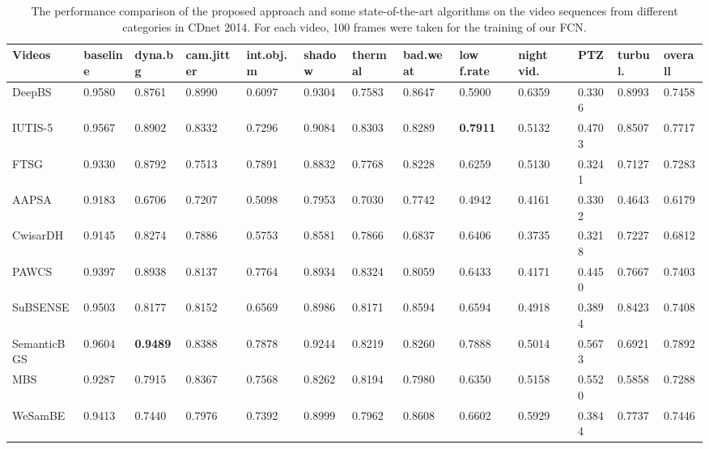 \documentclass[journal]{IEEEtran}
\begin{document}
\begin{table}[!t]				%
\centering
\caption{The performance comparison of the proposed approach and some state-of-the-art algorithms on the video sequences from different categories in CDnet 2014. For each video, 100 frames were taken for the training of our FCN.}
\label{tab1}
\begin{tabular}{lllllllllllll}
\hline
Videos      & baseline & dyna.bg & cam.jitter & int.obj.m & shadow & thermal & bad.weat & low f.rate & night vid. & PTZ    & turbul. & overall \\ \hline
DeepBS\cite{Babaee2017deep}      & 0.9580   & 0.8761  & 0.8990     & 0.6097    & 0.9304 & 0.7583  & 0.8647   & 0.5900     & 0.6359     & 0.3306 & 0.8993  & 0.7458  \\
IUTIS-5\cite{Bianco2017TEC}     & 0.9567   & 0.8902  & 0.8332     & 0.7296    & 0.9084 & 0.8303  & 0.8289   & \textbf{0.7911}     & 0.5132     & 0.4703 & 0.8507  & 0.7717  \\
FTSG\cite{Wang2014FTSG}        & 0.9330   & 0.8792  & 0.7513     & 0.7891    & 0.8832 & 0.7768  & 0.8228   & 0.6259     & 0.5130     & 0.3241 & 0.7127  & 0.7283  \\
AAPSA\cite{RAMIREZALONSO2016990}       & 0.9183   & 0.6706  & 0.7207     & 0.5098    & 0.7953 & 0.7030  & 0.7742   & 0.4942     & 0.4161     & 0.3302 & 0.4643  & 0.6179  \\
CwisarDH\cite{Gregorio2014CwisarDH}    & 0.9145   & 0.8274  & 0.7886     & 0.5753    & 0.8581 & 0.7866  & 0.6837   & 0.6406     & 0.3735     & 0.3218 & 0.7227  & 0.6812  \\
PAWCS\cite{Charles2015PAWCS}       & 0.9397   & 0.8938  & 0.8137     & 0.7764    & 0.8934 & 0.8324  & 0.8059   & 0.6433     & 0.4171     & 0.4450 & 0.7667  & 0.7403  \\
SuBSENSE\cite{St-Charles2015SuBSENSE}    & 0.9503   & 0.8177  & 0.8152     & 0.6569    & 0.8986 & 0.8171  & 0.8594   & 0.6594     & 0.4918     & 0.3894 & 0.8423  & 0.7408  \\
SemanticBGS\cite{Braham2017Semantic} & 0.9604   & \textbf{0.9489}  & 0.8388     & 0.7878    & 0.9244 & 0.8219  & 0.8260   & 0.7888     & 0.5014     & 0.5673 & 0.6921  & 0.7892  \\
MBS\cite{Multimode_Background_Subtraction}         & 0.9287   & 0.7915  & 0.8367     & 0.7568    & 0.8262 & 0.8194  & 0.7980   & 0.6350     & 0.5158     & 0.5520 & 0.5858  & 0.7288  \\
WeSamBE\cite{2017_TCSVT_BG_7938679}     & 0.9413   & 0.7440  & 0.7976     & 0.7392    & 0.8999 & 0.7962  & 0.8608   & 0.6602     & 0.5929     & 0.3844 & 0.7737  & 0.7446  \\

\end{tabular}
\end{table}
\end{document}
